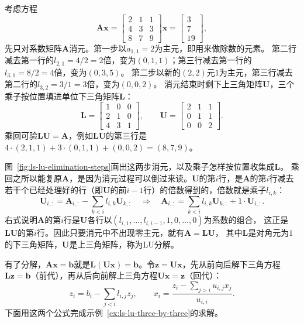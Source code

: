 \begin{example}[三阶消元与LU分解]
\label{ex:ls-lu-three-by-three}
考虑方程
\[
 \bm A\bm x=\begin{bmatrix}2&1&1\\4&3&3\\8&7&9\end{bmatrix}\bm x
 =\begin{bmatrix}3\\7\\19\end{bmatrix},
\]
先只对系数矩阵$\bm A$消元。第一步以$a_{1,1}=2$为主元，即用来做除数的元素。
第二行减去第一行的$l_{2,1}=4/2=2$倍，变为$(0,1,1)$；第三行减去第一行的$l_{3,1}=8/2=4$倍，变为$(0,3,5)$。
第二步以新的$(2,2)$元$1$为主元，第三行减去第二行的$l_{3,2}=3/1=3$倍，变为$(0,0,2)$。
消元结束时剩下上三角矩阵$\bm U$，三个乘子按位置填进单位下三角矩阵$\bm L$：
\[
 \bm L=\begin{bmatrix}1&0&0\\2&1&0\\4&3&1\end{bmatrix},\qquad
 \bm U=\begin{bmatrix}2&1&1\\0&1&1\\0&0&2\end{bmatrix}.
\]
乘回可验$\bm L\bm U=\bm A$，例如$\bm L\bm U$的第三行是$4\cdot(2,1,1)+3\cdot(0,1,1)+(0,0,2)=(8,7,9)$。
\end{example}

图~\ref{fig:ls-lu-elimination-steps}画出这两步消元，以及乘子怎样按位置收集成$\bm L$。
乘回之所以能复原$\bm A$，是因为消元过程可以倒过来读。$\bm U$的第$i$行，是$\bm A$的第$i$行减去
若干个已经处理好的行（即$\bm U$的前$i-1$行）的倍数得到的，倍数就是乘子$l_{i,k}$：
\[
 \bm U_{i,:}=\bm A_{i,:}-\sum_{k<i}l_{i,k}\bm U_{k,:}
 \quad\Longrightarrow\quad
 \bm A_{i,:}=\sum_{k<i}l_{i,k}\bm U_{k,:}+1\cdot\bm U_{i,:}.
\]
右式说明$\bm A$的第$i$行是$\bm U$各行以$(l_{i,1},\ldots,l_{i,i-1},1,0,\ldots,0)$为系数的组合，
这正是$\bm L\bm U$的第$i$行。因此只要消元中不出现零主元，就有$\bm A=\bm L\bm U$，
其中$\bm L$是对角元为$1$的下三角矩阵，$\bm U$是上三角矩阵，称为LU分解。

有了分解，$\bm A\bm x=\bm b$就是$\bm L(\bm U\bm x)=\bm b$。令$\bm z=\bm U\bm x$，先从前向后解下三角方程
$\bm L\bm z=\bm b$（前代），再从后向前解上三角方程$\bm U\bm x=\bm z$（回代）：
\begin{equation}
 z_i=b_i-\sum_{j<i}l_{i,j}z_j,\qquad
 x_i=\frac{z_i-\sum_{j>i}u_{i,j}x_j}{u_{i,i}}.
\end{equation}
下面用这两个公式完成示例~\ref{ex:ls-lu-three-by-three}的求解。


